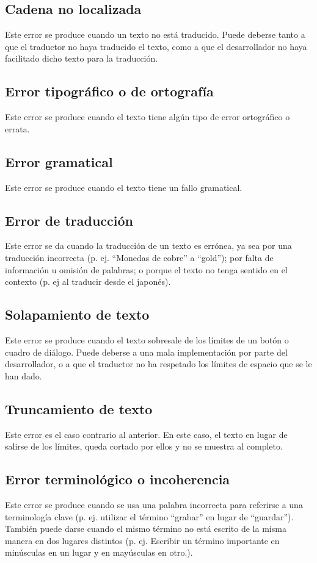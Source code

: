 \subsection{Cadena no localizada}\label{ErrorNoLocalizada}
Este error se produce cuando un texto no está traducido. Puede deberse tanto a que el traductor no haya traducido el texto, como a que el desarrollador no haya facilitado dicho texto para la traducción. 
\subsection{Error tipográfico o de ortografía}\label{ErrorTypo}
Este error se produce cuando el texto tiene algún tipo de error ortográfico o errata.

\subsection{Error gramatical}\label{ErrorGramatical}
Este error se produce cuando el texto tiene un fallo gramatical.

\subsection{Error de traducción}\label{ErrorTraducción}
Este error se da cuando la traducción de un texto es errónea, ya sea por una traducción incorrecta (p. ej. ``Monedas de cobre'' a ``gold''); por falta de información u omisión de palabras; o porque el texto no tenga sentido en el contexto (p. ej al traducir desde el japonés).

\subsection{Solapamiento de texto}\label{ErrorSolapamiento}
Este error se produce cuando el texto sobresale de los límites de un botón o cuadro de diálogo. Puede deberse a una mala implementación por parte del desarrollador, o a que el traductor no ha respetado los límites de espacio que se le han dado.

\subsection{Truncamiento de texto}\label{ErrorTruncamiento}
Este error es el caso contrario al anterior. En este caso, el texto en lugar de salirse de los límites, queda cortado por ellos y no se muestra al completo.

\subsection{Error terminológico o incoherencia}\label{ErrorTermino}
Este error se produce cuando se usa una palabra incorrecta para referirse a una terminología clave (p. ej. utilizar el término ``grabar'' en lugar de ``guardar''). También puede darse cuando el mismo término no está escrito de la misma manera en dos lugares distintos (p. ej. Escribir un término importante en minúsculas en un lugar y en mayúsculas en otro.).

